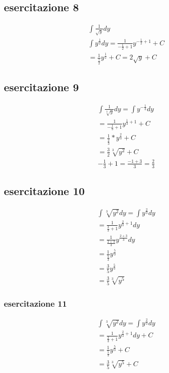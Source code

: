 \subsection{esercitazione 8}
	\begin{equation}
		\begin{matrix}
			\int \frac{1}{\sqrt{y}}dy\\
			\int
			y^{\frac{1}{2}}dy=\frac{1}{-\frac{1}{2}+1}y^{-\frac{1}{2}+1}+C\\
			=\frac{1}{\frac{1}{2}}y^\frac{1}{2}+C=2\sqrt{y}+C
		\end{matrix}
	\end{equation}
\subsection{esercitazione 9}
	\begin{equation}
		\begin{matrix}
			\int \frac{1}{\sqrt[3]{y}}dy=\int y^{-\frac{1}{3}}dy\\
			=\frac{1}{-\frac{1}{3}+1}y^{\frac{1}{3}+1}+C\\
			=\frac{1}{\frac{2}{3}}*y^{\frac{2}{3}}+C\\
			=\frac{3}{2}\sqrt[3]{y^2}+C\\
			-\frac{1}{3}+1=\frac{-1+3}{3}=\frac{2}{3}
		\end{matrix}
	\end{equation}
\subsection{esercitazione 10}
	\begin{equation}
		\begin{matrix}
			\int \sqrt[3]{y^2}dy=\int y^{\frac{2}{3}}dy\\
			=\frac{1}{\frac{2}{3}+1}y^{\frac{2}{3}+1}dy\\
			=\frac{1}{\frac{2+3}{3}}y^{\frac{2+3}{3}}dy\\
			=\frac{1}{\frac{5}{3}}y^{\frac{5}{3}}\\
			=\frac{3}{5}y^\frac{5}{3}\\
			=\frac{3}{5}\sqrt[3]{y^5}
		\end{matrix}
	\end{equation}
\subsubsection{esercitazione 11}
	\begin{equation}
		\begin{matrix}
			\int \sqrt[3]{y^2}dy=\int
			y^{\frac{2}{3}}dy\\
			=\frac{1}{\frac{2}{3}+1}y^{\frac{2}{3}+1}dy+C\\
			=\frac{1}{\frac{5}{3}}y^{\frac{5}{3}}+C\\
			=\frac{3}{5}\sqrt[3]{y^5}+C
		\end{matrix}
	\end{equation}

